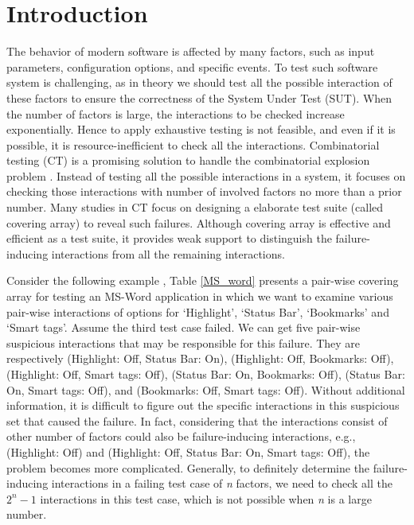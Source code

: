 \section{Introduction}\label{sec:intro}

The behavior of modern software is affected by many factors, such as input parameters, configuration options, and specific events. To test such software system is challenging, as in theory we should test all the possible interaction of these factors to ensure the correctness of the System Under Test (SUT)\cite{song2012itree}. When the number of factors is large, the interactions to be checked increase exponentially. Hence to apply exhaustive testing is not feasible, and even if it is possible, it is resource-inefficient to check all the interactions. Combinatorial testing (CT) is a promising solution to handle the combinatorial explosion problem \cite{kuhn2002investigation,kuhn2004software}. Instead of testing all the possible interactions in a system, it focuses on checking those interactions with number of involved factors no more than a prior number. Many studies in CT focus on designing a elaborate test suite (called covering array) to reveal such failures. Although covering array is effective and efficient as a test suite, it provides weak support to distinguish the failure-inducing interactions from all the remaining interactions.

Consider the following example \cite{bach2004pairwise}, Table \ref{MS_word} presents a pair-wise covering array for testing an MS-Word application in which we want to examine various pair-wise interactions of options for `Highlight', `Status Bar', `Bookmarks' and `Smart tags'. Assume the third test case failed. We can get five pair-wise suspicious interactions that may be responsible for this failure. They are respectively (Highlight: Off, Status Bar: On), (Highlight: Off, Bookmarks: Off), (Highlight: Off, Smart tags: Off), (Status Bar: On, Bookmarks: Off), (Status Bar: On, Smart tags: Off),  and (Bookmarks: Off, Smart tags: Off). Without additional information, it is difficult to figure out the specific interactions in this suspicious set that caused the failure. In fact, considering that the interactions consist of other number of factors could also be failure-inducing interactions, e.g., (Highlight: Off) and (Highlight: Off, Status Bar: On, Smart tags: Off), the problem becomes more complicated. Generally, to definitely determine the failure-inducing interactions in a failing test case of \emph{n} factors, we need to check all the $2^n - 1$ interactions in this test case, which is not possible when \emph{n} is a large number.

